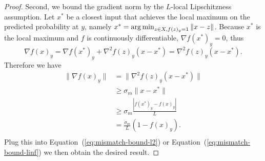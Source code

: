 \begin{proof}
Second, we bound the gradient norm by the $L$-local Lipschitzness assumption.
    Let $x^*$ be a closest input that achieves the local maximum on the predicted probability at $y$, namely $x^* = \operatorname*{arg\,min}_{z \in X, f(z)_y = 1} \|x - z\|$. Because $x^*$ is the local maximum and $f$ is continuously differentiable, $\nabla f(x^*)_y = 0$, thus
    $$
    \nabla f(x)_y 
    = \nabla f(x^*)_y  + \nabla^2 f(z)_y  (x - x^*) = \nabla^2 f(z)_y  (x - x^*).
    $$
    Therefore we have
    $$
    \begin{aligned}
    \|\nabla f(x)_y \| 
    & =  \|\nabla^2 f(z)_y  (x - x^*) \| \\
    & \ge \sigma_{m} \|x - x^*\| \\
    & \ge \sigma_{m}  \frac{|f(x^*)_y  - f(x)_y |}{L} \\
    & = \frac{\sigma_{m}}{L} (1 - f(x)_y). \\
    \end{aligned}
    $$
Plug this into Equation~(\ref{eq:mismatch-bound-l2}) or Equation~(\ref{eq:mismatch-bound-linf}) we then obtain the desired result.
\end{proof}




